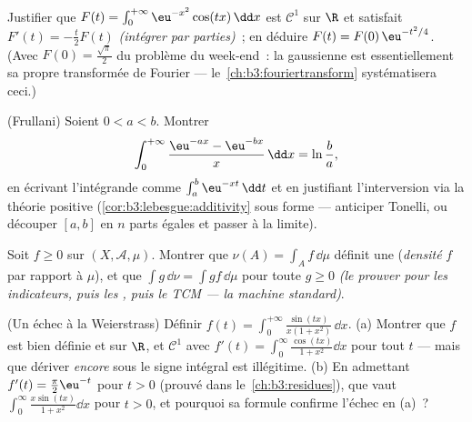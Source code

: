 \begin{exercise}[$\star\star$]\label{exo:b3:lebesgue:7}
Justifier que $F(t) =
\int_0^{+\infty}\eu^{-x^2}\cos(tx)\,\dd x$ est $\mathcal
C^1$ sur $\R$ et satisfait $F'(t) = -\frac t2F(t)$
\emph{(intégrer par parties)}~; en déduire $F(t) =
F(0)\,\eu^{-t^2/4}$. (Avec $F(0) = \frac{\sqrt\pi}2$ du
problème du week-end~: la gaussienne est essentiellement sa
propre transformée de Fourier ---
le~\cref{ch:b3:fouriertransform} systématisera ceci.)
\end{exercise}

\begin{exercise}[$\star\star\star$]\label{exo:b3:lebesgue:8}
(Frullani) Soient $0 < a < b$. Montrer
\[
\int_0^{+\infty}\frac{\eu^{-ax} - \eu^{-bx}}{x}\,\dd x =
\ln\frac ba,
\]
en écrivant l'intégrande comme $\int_a^b \eu^{-xt}\,\dd t$
et en justifiant l'interversion via la théorie positive
(\cref{cor:b3:lebesgue:additivity} sous forme  ---
anticiper Tonelli, ou découper $[a,b]$ en $n$ parts égales
et passer à la limite).
\end{exercise}

\begin{exercise}[$\star\star$]\label{exo:b3:lebesgue:9}
Soit $f \geq 0$  sur $(X, \mathcal A, \mu)$.
Montrer que $\nu(A) = \int_A f\,\dd\mu$ définit une 
(\emph{densité} $f$ par
rapport à $\mu$), et que $\int g\,\dd\nu = \int
gf\,\dd\mu$ pour toute $g \geq 0$  \emph{(le
prouver pour les indicateurs, puis les , puis le TCM
--- la machine standard)}.
\end{exercise}

\begin{exercise}[$\star\star\star$]\label{exo:b3:lebesgue:10}
(Un échec à la Weierstrass) Définir $f(t) =
\int_0^{+\infty}\frac{\sin(tx)}{x(1 + x^2)}\,\dd x$.
(a) Montrer que $f$ est bien définie et  sur $\R$,
et $\mathcal C^1$ avec $f'(t) =
\int_0^\infty\frac{\cos(tx)}{1 + x^2}\dd x$ pour tout $t$
--- mais que dériver \emph{encore} sous le signe intégral
est illégitime.
(b) En admettant $f'(t) = \frac\pi2\eu^{-t}$ pour $t > 0$
(prouvé dans le~\cref{ch:b3:residues}), que vaut
$\int_0^\infty\frac{x\sin(tx)}{1+x^2}\dd x$ pour $t > 0$,
et pourquoi sa formule confirme l'échec en (a)~?
\end{exercise}

